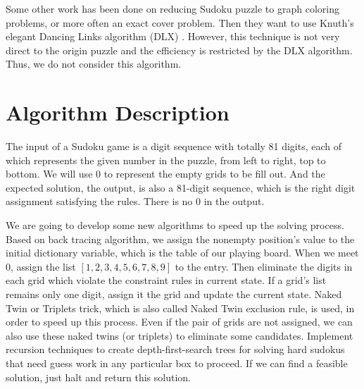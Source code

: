 \documentclass[12pt]{article}
\begin{document}
\begin{spacing}{1.1}
Some other work has been done on reducing Sudoku puzzle to graph coloring problems, or more often an exact cover problem. Then they want to use Knuth’s elegant Dancing Links algorithm (DLX) \cite{dlx}. However, this technique is not very direct to the origin puzzle and the efficiency is restricted by the DLX algorithm. Thus, we do not consider this algorithm.


\section{Algorithm Description}

The input of a Sudoku game is a digit sequence with totally 81 digits, each of which represents the given number in the puzzle, from left to right, top to bottom. We will use $ 0 $ to represent the empty grids to be fill out. And the expected solution, the output, is also a 81-digit sequence, which is the right digit assignment satisfying the rules. There is no $ 0 $ in the output.

We are going to develop some new algorithms to speed up the solving process. Based on back tracing algorithm, we assign the nonempty position's value to the initial dictionary variable, which is the table of our playing board. When we meet $ 0 $, assign the list $ [1,2,3,4,5,6,7,8,9] $ to the entry. Then eliminate the digits in each grid which violate the constraint rules in current state. If a grid's list remains only one digit, assign it the grid and update the current state. Naked Twin or Triplets trick, which is also called Naked Twin exclusion rule, is used,  in order to speed up this process. Even if the pair of grids are not assigned, we can also use these naked twins (or triplets) to eliminate some candidates. Implement recursion techniques to create depth-first-search trees for solving hard sudokus that need guess work in any particular box to proceed. If we can find a feasible solution, just halt and return this solution.



\end{spacing}
\end{document}
